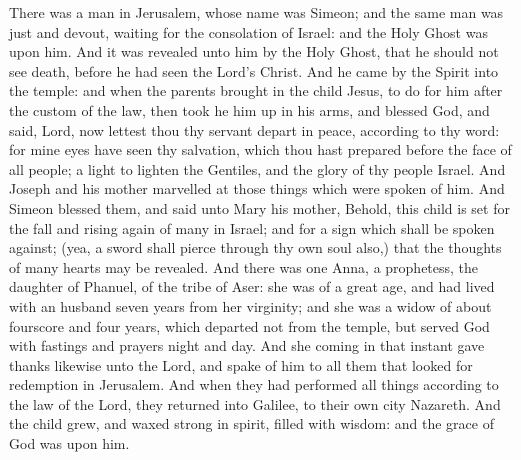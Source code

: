 
 There was a man in Jerusalem, whose name was Simeon; and the same man was just and devout, waiting for the consolation of Israel: and the Holy Ghost was upon him. And it was revealed unto him by the Holy Ghost, that he should not see death, before he had seen the Lord’s Christ. And he came by the Spirit into the temple: and when the parents brought in the child Jesus, to do for him after the custom of the law, then took he him up in his arms, and blessed God, and said, Lord, now lettest thou thy servant depart in peace, according to thy word: for mine eyes have seen thy salvation, which thou hast prepared before the face of all people; a light to lighten the Gentiles, and the glory of thy people Israel. And Joseph and his mother marvelled at those things which were spoken of him. And Simeon blessed them, and said unto Mary his mother, Behold, this child is set for the fall and rising again of many in Israel; and for a sign which shall be spoken against; (yea, a sword shall pierce through thy own soul also,) that the thoughts of many hearts may be revealed. And there was one Anna, a prophetess, the daughter of Phanuel, of the tribe of Aser: she was of a great age, and had lived with an husband seven years from her virginity; and she was a widow of about fourscore and four years, which departed not from the temple, but served God with fastings and prayers night and day. And she coming in that instant gave thanks likewise unto the Lord, and spake of him to all them that looked for redemption in Jerusalem. And when they had performed all things according to the law of the Lord, they returned into Galilee, to their own city Nazareth. And the child grew, and waxed strong in spirit, filled with wisdom: and the grace of God was upon him.


\vspace{-0.25\baselineskip}

